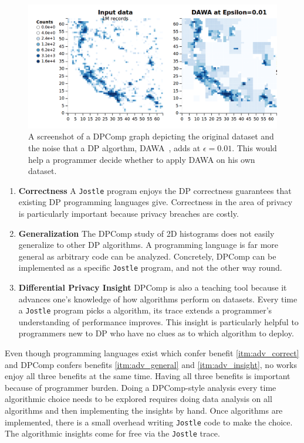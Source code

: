 \documentclass[11pt]{report}
\newcommand{\Jostle}{\texttt{Jostle}}
\begin{document}
\begin{figure}
\begin{center}
\includegraphics[scale=0.3]{DPComp}
\end{center}
\caption{A screenshot of a DPComp graph depicting the original dataset and the noise that a DP algorthm, DAWA~\cite{Li:2014}, adds at $\epsilon=0.01$. This would help a programmer decide whether to apply DAWA on his own dataset.}\label{fig:dpcomp}
\end{figure}
\begin{enumerate}
\item \textbf{Correctness} A \Jostle{} program enjoys the DP correctness guarantees that existing DP programming languages give. Correctness in the area of privacy is particularly important because privacy breaches are costly.
\label{itm:adv_correct}
\item \textbf{Generalization} The DPComp study of 2D histograms does not easily generalize to other DP algorithms. A programming language is far more general as arbitrary code can be analyzed. Concretely, DPComp can be implemented as a specific \Jostle{} program, and not the other way round.
\label{itm:adv_general}
\item \textbf{Differential Privacy Insight} DPComp is also a teaching tool because it advances one's knowledge of how algorithms perform on datasets. Every time a \Jostle{} program picks a algorithm, its trace extends a programmer's understanding of performance improves. This insight is particularly helpful to programmers new to DP who have no clues as to which algorithm to deploy.
\label{itm:adv_insight}
\end{enumerate}

Even though programming languages exist which confer benefit \ref{itm:adv_correct} and DPComp confers benefits \ref{itm:adv_general} and \ref{itm:adv_insight}, no works enjoy all three benefits at the same time. Having all three benefits is important because of programmer burden. Doing a DPComp-style analysis every time algorithmic choice needs to be explored requires doing data analysis on all algorithms and then implementing the insights by hand. Once algorithms are implemented, there is a small overhead writing \Jostle{} code to make the choice. The algorithmic insights come for free via the \Jostle{} trace.
\end{document}
